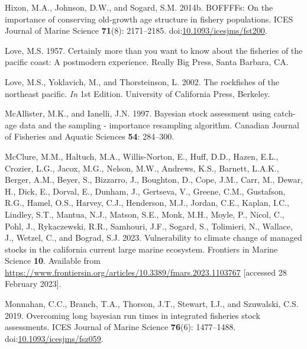 \documentclass[11pt,
  english,
  letterpaper,
]{article}
\newlength{\cslhangindent}
\newenvironment{CSLReferences}[2] %
 {%
  \setlength{\parindent}{0pt}
  \ifodd #1 \everypar{\setlength{\hangindent}{\cslhangindent}}\ignorespaces\fi
  \ifnum #2 > 0
  \setlength{\parskip}{#2\baselineskip}
  \fi
 }%
 {}
\begin{document}
\begin{CSLReferences}{1}{0}
\leavevmode{}%
Hixon, M.A., Johnson, D.W., and Sogard, S.M. 2014b. {BOFFFFs}: On the importance of conserving old-growth age structure in fishery populations. {ICES} Journal of Marine Science \textbf{71}(8): 2171--2185. doi:\href{https://doi.org/10.1093/icesjms/fst200}{10.1093/icesjms/fst200}.

\leavevmode{}%
Love, M.S. 1957. Certainly more than you want to know about the fisheries of the pacific coast: A postmodern experience. Really Big Press, Santa Barbara, CA.

\leavevmode{}%
Love, M.S., Yoklavich, M., and Thorsteinson, L. 2002. The rockfishes of the northeast pacific. \emph{In} 1st Edition. University of California Press, Berkeley.

\leavevmode{}%
McAllister, M.K., and Ianelli, J.N. 1997. Bayesian stock assessment using catch-age data and the sampling - importance resampling algorithm. Canadian Journal of Fisheries and Aquatic Sciences \textbf{54}: 284--300.

\leavevmode{}%
McClure, M.M., Haltuch, M.A., Willis-Norton, E., Huff, D.D., Hazen, E.L., Crozier, L.G., Jacox, M.G., Nelson, M.W., Andrews, K.S., Barnett, L.A.K., Berger, A.M., Beyer, S., Bizzarro, J., Boughton, D., Cope, J.M., Carr, M., Dewar, H., Dick, E., Dorval, E., Dunham, J., Gertseva, V., Greene, C.M., Gustafson, R.G., Hamel, O.S., Harvey, C.J., Henderson, M.J., Jordan, C.E., Kaplan, I.C., Lindley, S.T., Mantua, N.J., Matson, S.E., Monk, M.H., Moyle, P., Nicol, C., Pohl, J., Rykaczewski, R.R., Samhouri, J.F., Sogard, S., Tolimieri, N., Wallace, J., Wetzel, C., and Bograd, S.J. 2023. Vulnerability to climate change of managed stocks in the california current large marine ecosystem. Frontiers in Marine Science \textbf{10}. Available from \url{https://www.frontiersin.org/articles/10.3389/fmars.2023.1103767} {[}accessed 28 February 2023{]}.

\leavevmode{}%
Monnahan, C.C., Branch, T.A., Thorson, J.T., Stewart, I.J., and Szuwalski, C.S. 2019. Overcoming long bayesian run times in integrated fisheries stock assessments. {ICES} Journal of Marine Science \textbf{76}(6): 1477--1488. doi:\href{https://doi.org/10.1093/icesjms/fsz059}{10.1093/icesjms/fsz059}.


\end{CSLReferences}
\end{document}
